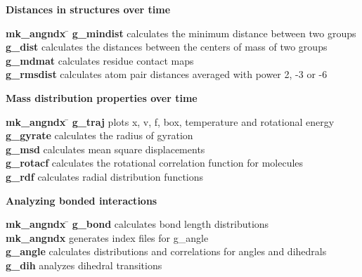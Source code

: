 \begin{description}
\item {\large\bf Distances in structures over time}
\vspace{-2ex}\begin{tabbing}
{\bf mk\_angndx} \= \kill
{\bf g\_mindist} \> calculates the minimum distance between two groups \\
{\bf g\_dist} \> calculates the distances between the centers of mass of two groups \\
{\bf g\_mdmat} \> calculates residue contact maps \\
{\bf g\_rmsdist} \> calculates atom pair distances averaged with power 2, -3 or -6 \\
\end{tabbing}\vspace{-2ex}

\item {\large\bf Mass distribution properties over time}
\vspace{-2ex}\begin{tabbing}
{\bf mk\_angndx} \= \kill
{\bf g\_traj} \> plots x, v, f, box, temperature and rotational energy \\
{\bf g\_gyrate} \> calculates the radius of gyration \\
{\bf g\_msd} \> calculates mean square displacements \\
{\bf g\_rotacf} \> calculates the rotational correlation function for molecules \\
{\bf g\_rdf} \> calculates radial distribution functions \\
\end{tabbing}\vspace{-2ex}

\item {\large\bf Analyzing bonded interactions}
\vspace{-2ex}\begin{tabbing}
{\bf mk\_angndx} \= \kill
{\bf g\_bond} \> calculates bond length distributions \\
{\bf mk\_angndx} \> generates index files for g\_angle \\
{\bf g\_angle} \> calculates distributions and correlations for angles and dihedrals \\
{\bf g\_dih} \> analyzes dihedral transitions \\
\end{tabbing}\vspace{-2ex}


\end{description}
